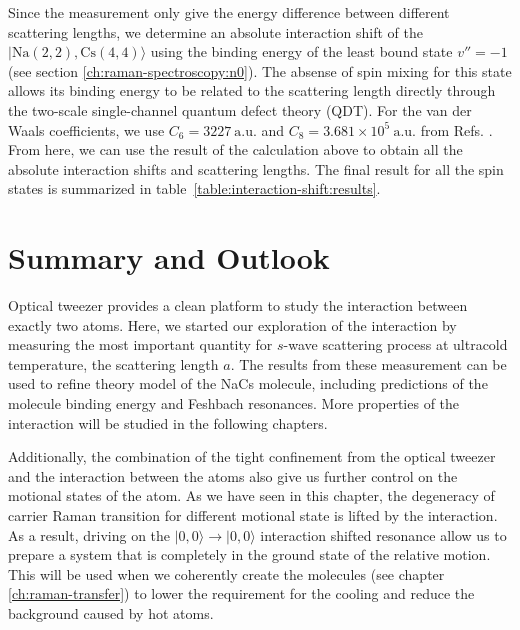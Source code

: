 Since the measurement only give the energy difference between different scattering lengths,
we determine an absolute interaction shift of the $|\mathrm{Na(2, 2),Cs(4, 4)}\rangle$
using the binding energy of the least bound state $v''=-1$
(see section \ref{ch:raman-spectroscopy:n0}).
The absense of spin mixing for this state allows its binding energy to be related
to the scattering length directly through
the two-scale single-channel quantum defect theory (QDT).
For the van der Waals coefficients, we use $C_6=3227~\mathrm{a.u.}$ and
$C_8=3.681\times10^5~\mathrm{a.u.}$ from
Refs. \cite{docenko_coupling_2006,mcguyer_high-precision_2015,porsev_accurate_2003}.
From here, we can use the result of the calculation above to obtain all the
absolute interaction shifts and scattering lengths.
The final result for all the spin states is summarized in
table~\ref{table:interaction-shift:results}.

\section{Summary and Outlook}
Optical tweezer provides a clean platform to study the interaction between exactly two atoms.
Here, we started our exploration of the interaction by measuring the most important quantity
for $s$-wave scattering process at ultracold temperature, the scattering length $a$.
The results from these measurement can be used to refine theory model of the NaCs molecule,
including predictions of the molecule binding energy
and Feshbach resonances\cite{hood_multichannel_2020}.
More properties of the interaction will be studied in the following chapters.

Additionally, the combination of the tight confinement from the optical tweezer
and the interaction between the atoms also give us further control
on the motional states of the atom.
As we have seen in this chapter, the degeneracy of carrier Raman transition
for different motional state is lifted by the interaction.
As a result, driving on the $|0,0\rangle\rightarrow|0,0\rangle$ interaction shifted resonance
allow us to prepare a system that is completely in the ground state of the relative motion.
This will be used when we coherently create the molecules (see chapter \ref{ch:raman-transfer})
to lower the requirement for the cooling and reduce the background caused by hot atoms.
